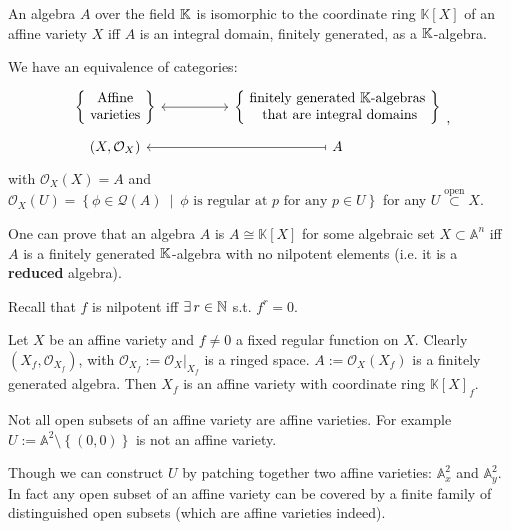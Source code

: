 \begin{thm}[]
	An algebra $A$ over the field $\mathbb{K}$ is isomorphic to the coordinate ring $\mathbb{K}[X]$ of an affine variety $X$ iff $A$ is an integral domain, finitely generated, as a $\mathbb{K}$-algebra.
\end{thm}

\begin{rem}
	We have an equivalence of categories:
	\begin{equation}
	\begin{tikzcd}[row sep=tiny]
			\left\{\begin{matrix}
				\text{ Affine }\\
				\text{ varieties }
			\end{matrix}\right\} \arrow[rr, "", leftrightarrow] & &
			\left\{  \begin{matrix}
				\text{ finitely generated } \K\text{-algebras }\\
				\text{ that are integral domains}
			\end{matrix}\right\} \\
			\left( X, \mathcal{O}_{ X } \right) & & A \arrow[ll, "", rightarrow, maps to]
	\end{tikzcd}
	,\end{equation} 
	with $\mathcal{O}_X(X) = A$ and $\mathcal{O}_X(U) = \left\{ \phi \in \mathcal{Q}(A) \ \middle|\ \phi \text{ is regular at } p \text{ for any } p \in U \right\}$ for any $U \stackrel{\text{open}}{\subset} X$.
\end{rem}

\begin{rem}
	One can prove that an algebra $A$ is $A \cong \mathbb{K}[X]$ for some algebraic set $X \subset \mathbb{A}^n$ iff $A$ is a finitely generated $\mathbb{K}$-algebra with no nilpotent elements (i.e. it is a \textbf{reduced} algebra).

	Recall that $f$ is nilpotent iff $\exists\, r \in \mathbb{N}$ s.t. $f^r = 0$.
\end{rem}

\begin{ex}
	Let $X$ be an affine variety and $f \neq 0$ a fixed regular function on $X$.
	Clearly $\left( X_f, \mathcal{O}_{ X_f } \right)$, with $\mathcal{O}_{X_f} := \left.\mathcal{O}_X\right|_{X_f}$ is a ringed space.
	$A := \mathcal{O}_X(X_f)$ is a finitely generated algebra.
	Then $X_f$ is an affine variety with coordinate ring $\mathbb{K}[X]_f$.
\end{ex} 

\begin{rem}
	Not all open subsets of an affine variety are affine varieties.
	For example $U := \mathbb{A}^2 \setminus \left\{ \left(0, 0 \right) \right\}$ is not an affine variety.

	Though we can construct $U$ by patching together two affine varieties: 
	$\mathbb{A}^{2}_x$ and $\mathbb{A}^{2}_y$.
	In fact any open subset of an affine variety can be covered by a finite family
	of distinguished open subsets (which are affine varieties indeed).
\end{rem}

